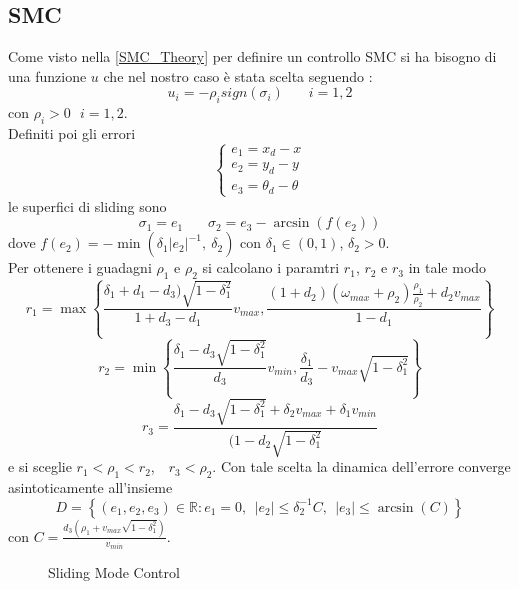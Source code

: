 \subsection{SMC}
Come visto nella \autoref{SMC_Theory} per definire un controllo SMC si ha bisogno di una funzione $u$ che nel nostro caso è stata scelta seguendo \cite{algoSMC}: 
\begin{equation}
        u_i=-\rho_{i}sign(\sigma_i)\: \: \: \: \: \: \: \:i=1,2
\end{equation}
con $\rho_i>0 \: \: \:i=1,2$. \\
Definiti poi gli errori 
\begin{equation}
\begin{cases}
    e_1=x_d-x 
   \\
   e_2=y_d-y
   \\
   e_3=\theta_d-\theta
\end{cases} 
\end{equation}
le superfici di sliding sono
\begin{equation}
       \sigma_1=e_1 \ \ \ \ \ \ \ \ \sigma_2=e_3-\arcsin(f(e_2))
\end{equation} 
dove $f(e_2)=-\min({\delta_1|e_2|^{-1},\ \delta_2})$ con $\delta_1 \in (0,1)$, $\delta_2>0$.\\ Per ottenere i guadagni $\rho_1$ e $\rho_2$ si calcolano i paramtri  $r_1$, $r_2$ e $r_3$ in tale modo
\begin{equation}
        r_1= \max\left\{\frac{\delta_1+d_1-d_3)\sqrt{1-\delta_1^{2}}}{1+d_3-d_1}v_{max}, \frac{(1+d_2)(\omega_{max}+\rho_2) \frac{\rho_1}{\rho_2}+d_2v_{max}}{1-d_1}\right\}
\end{equation}
\begin{equation}
        r_2= \min\left\{\frac{\delta_1-d_3\sqrt{1-\delta_1^{2}}}{d_3}v_{min}, \frac{\delta_1}{d_3}-v_{max}\sqrt{1-\delta_1^{2}}\right\}
\end{equation}
\begin{equation}
        r_3= \frac{\delta_1-d_3\sqrt{1-\delta_1^{2}}+\delta_2v_{max}+\delta_1v_{min}}{(1-d_2\sqrt{1-\delta_1^{2}}}
\end{equation}
e si sceglie $r_1<\rho_1<r_2$,\ \ $r_3<\rho_2$. Con tale scelta la dinamica dell'errore converge asintoticamente all'insieme
\begin{equation}
        D=\left\{(e_1,e_2,e_3) \in \mathbb{R}: e_1=0, \ \  |e_2|\le\delta_2^{-1}C, \ \ |e_3|\le \arcsin{(C)} \right\}
\end{equation}
con $C=\frac{d_3(\rho_1+v_{max}\sqrt{1-\delta_1^{2}})}{v_{min}}$.
\begin{figure} [H]
    \centering
    
    \caption{Sliding Mode Control}
    \label{fig:SMC}
\end{figure}
